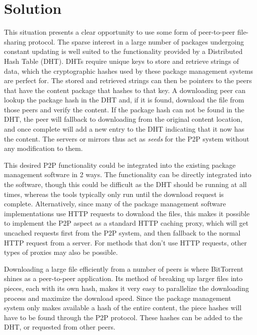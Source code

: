 \documentclass[conference]{IEEEtran}
\begin{document}
\section{Solution}

This situation presents a clear opportunity to use some form of
peer-to-peer file-sharing protocol. The sparse interest in a large
number of packages undergoing constant updating is well suited to
the functionality provided by a Distributed Hash Table (DHT). DHTs
require unique keys to store and retrieve strings of data, which the
cryptographic hashes used by these package management systems are
perfect for. The stored and retrieved strings can then be pointers
to the peers that have the content package that hashes to that key.
A downloading peer can lookup the package hash in the DHT and, if it
is found, download the file from those peers and verify the content.
If the package hash can not be found in the DHT, the peer will
fallback to downloading from the original content location, and once
complete will add a new entry to the DHT indicating that it now has
the content. The servers or mirrors thus act as \emph{seeds} for the
P2P system without any modification to them.

This desired P2P functionality could be integrated into the existing
package management software in 2 ways. The functionality can be
directly integrated into the software, though this could be
difficult as the DHT should be running at all times, whereas the
tools typically only run until the download request is complete.
Alternatively, since many of the package management software
implementations use HTTP requests to download the files, this makes
it possible to implement the P2P aspect as a standard HTTP caching
proxy, which will get uncached requests first from the P2P system,
and then fallback to the normal HTTP request from a server. For
methods that don't use HTTP requests, other types of proxies may
also be possible.

Downloading a large file efficiently from a number of peers is where
BitTorrent shines as a peer-to-peer application. Its method of
breaking up larger files into pieces, each with its own hash, makes
it very easy to parallelize the downloading process and maximize the
download speed. Since the package management system only makes
available a hash of the entire content, the piece hashes will have
to be found through the P2P protocol. These hashes can be added to
the DHT, or requested from other peers.
\end{document}
